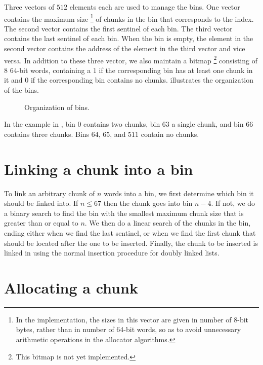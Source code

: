 Three vectors of $512$ elements each are used to manage the bins.  One
vector contains the maximum size%
\footnote{In the implementation, the sizes in this vector are given in
  number of 8-bit bytes, rather than in number of 64-bit words, so as
  to avoid unnecessary arithmetic operations in the allocator
  algorithms.}  of chunks in the bin that corresponds to the index.
The second vector contains the first sentinel of each bin.  The third
vector contains the last sentinel of each bin.  When the bin is empty,
the element in the second vector contains the address of the element
in the third vector and vice versa.  In addition to these three
vector, we also maintain a bitmap%
\footnote{This bitmap is not yet implemented.}  consisting of $8$
$64$-bit words, containing a $1$ if the corresponding bin has at least
one chunk in it and $0$ if the corresponding bin contains no chunks.
 illustrates the organization of the bins.

\begin{figure}
\begin{center}
\end{center}
\caption{\label{fig-bins}
Organization of bins.}
\end{figure}

In the example in , bin $0$ contains two chunks, bin
$63$ a single chunk, and bin $66$ contains three chunks.  Bins $64$,
$65$, and $511$ contain no chunks.

\section{Linking a chunk into a bin}

To link an arbitrary chunk of $n$ words into a bin, we first determine
which bin it should be linked into.  If $n \le 67$ then the chunk goes
into bin $n-4$.  If not, we do a binary search to find the bin with
the smallest maximum chunk size that is greater than or equal to $n$.
We then do a linear search of the chunks in the bin, ending either
when we find the last sentinel, or when we find the first chunk that
should be located after the one to be inserted.  Finally, the chunk to
be inserted is linked in using the normal insertion procedure for
doubly linked lists.

\section{Allocating a chunk}

